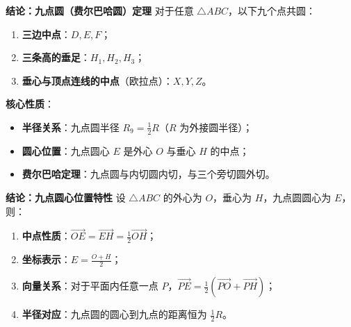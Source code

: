 \begin{statementbox}
\textbf{结论：九点圆（费尔巴哈圆）定理}
对于任意 $\triangle ABC$，以下九个点共圆：
\begin{enumerate}
    \item \textbf{三边中点}：$D, E, F$；
    \item \textbf{三条高的垂足}：$H_1, H_2, H_3$；
    \item \textbf{垂心与顶点连线的中点}（欧拉点）：$X, Y, Z$。
\end{enumerate}
\textbf{核心性质}：
\begin{itemize}
    \item \textbf{半径关系}：九点圆半径 $R_9 = \frac{1}{2}R$（$R$ 为外接圆半径）；
    \item \textbf{圆心位置}：九点圆心 $E$ 是外心 $O$ 与垂心 $H$ 的中点；
    \item \textbf{费尔巴哈定理}：九点圆与内切圆内切，与三个旁切圆外切。
\end{itemize}
\end{statementbox}

\begin{statementbox}
\textbf{结论：九点圆心位置特性}
设 $\triangle ABC$ 的外心为 $O$，垂心为 $H$，九点圆圆心为 $E$，则：
\begin{enumerate}
    \item \textbf{中点性质}：$\vec{OE} = \vec{EH} = \frac{1}{2}\vec{OH}$；
    \item \textbf{坐标表示}：$E = \frac{O + H}{2}$；
    \item \textbf{向量关系}：对于平面内任意一点 $P$，$\vec{PE} = \frac{1}{2}(\vec{PO} + \vec{PH})$；
    \item \textbf{半径对应}：九点圆的圆心到九点的距离恒为 $\frac{1}{2}R$。
\end{enumerate}
\end{statementbox}
